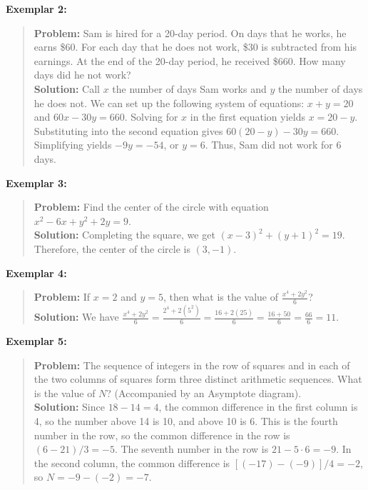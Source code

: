 \documentclass{article}
\begin{document}
\noindent\textbf{Exemplar 2:}
\begin{quote}
\small
\textbf{Problem:} Sam is hired for a 20-day period. On days that he works, he earns \$60. For each day that he does not work, \$30 is subtracted from his earnings. At the end of the 20-day period, he received \$660. How many days did he not work? \\
\textbf{Solution:} Call $x$ the number of days Sam works and $y$ the number of days he does not. We can set up the following system of equations: $x+y = 20$ and $60x - 30y = 660$. Solving for $x$ in the first equation yields $x = 20 - y$. Substituting into the second equation gives $60(20-y) - 30y = 660$. Simplifying yields $-9y = -54$, or $y = 6$. Thus, Sam did not work for $\boxed{6}$ days.
\end{quote}

\noindent\textbf{Exemplar 3:}
\begin{quote}
\small
\textbf{Problem:} Find the center of the circle with equation $x^2 - 6x + y^2 + 2y = 9$. \\
\textbf{Solution:} Completing the square, we get $(x - 3)^2 + (y + 1)^2 = 19$. Therefore, the center of the circle is $\boxed{(3, -1)}$.
\end{quote}

\noindent\textbf{Exemplar 4:}
\begin{quote}
\small
\textbf{Problem:} If $x = 2$ and $y = 5$, then what is the value of $\frac{x^4+2y^2}{6}$? \\
\textbf{Solution:} We have $\frac{x^4 + 2y^2}{6} = \frac{2^4 + 2(5^2)}{6} = \frac{16+2(25)}{6} = \frac{16+50}{6} = \frac{66}{6} = \boxed{11}$.
\end{quote}

\noindent\textbf{Exemplar 5:}
\begin{quote}
\small
\textbf{Problem:} The sequence of integers in the row of squares and in each of the two columns of squares form three distinct arithmetic sequences. What is the value of $N$? (Accompanied by an Asymptote diagram). \\
\textbf{Solution:} Since $18 - 14 = 4$, the common difference in the first column is 4, so the number above 14 is 10, and above 10 is 6. This is the fourth number in the row, so the common difference in the row is $(6 - 21)/3 = -5$. The seventh number in the row is $21 - 5 \cdot 6 = -9$. In the second column, the common difference is $[(-17) - (-9)]/4 = -2$, so $N = -9 - (-2) = \boxed{-7}$.
\end{quote}
\end{document}
